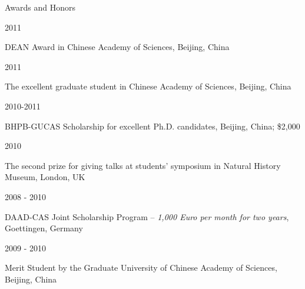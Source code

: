 \documentclass{resume} %
\begin{document}
\begin{rSection}{Awards and Honors}

\begin{rSubsection}{2011}{}{}{}
\item{DEAN Award in Chinese Academy of Sciences, Beijing, China}
\end{rSubsection}

\begin{rSubsection}{2011}{}{}{}
\item{The excellent graduate student in Chinese Academy of Sciences, Beijing, China}
\end{rSubsection}

\begin{rSubsection}{2010-2011}{}{}{}
\item{BHPB-GUCAS Scholarship for excellent Ph.D. candidates, Beijing, China; \$2,000} 
\end{rSubsection}

\begin{rSubsection}{2010}{}{}{}
\item{The second prize for giving talks at students’ symposium in Natural History Museum, London, UK}
\end{rSubsection}

\begin{rSubsection}{2008 - 2010 }{}{}{}
\item{DAAD-CAS Joint Scholarship Program -- \textit{1,000 Euro per month for two years}, Goettingen, Germany}
\end{rSubsection}{}

\begin{rSubsection}{2009 - 2010}{}{}{}
\item{Merit Student by the Graduate University of Chinese Academy of Sciences, Beijing, China}
\end{rSubsection}

\end{rSection}
\end{document}
